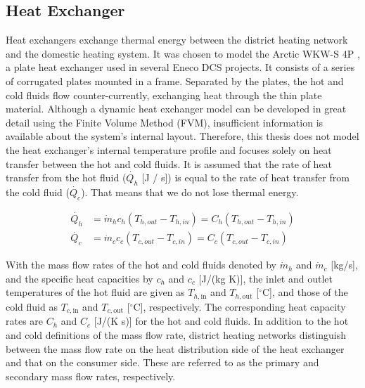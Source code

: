 

\subsection{Heat Exchanger}
Heat exchangers exchange thermal energy between the district heating network and the domestic heating system. It was chosen to model the Arctic WKW-S 4P \cite{fortes_wkw_s_4p}, a plate heat exchanger used in several Eneco DCS projects. It consists of a series of corrugated plates mounted in a frame. Separated by the plates, the hot and cold fluids flow counter-currently, exchanging heat through the thin plate material. Although a dynamic heat exchanger model can be developed in great detail using the Finite Volume Method (FVM), insufficient information is available about the system's internal layout. Therefore, this thesis does not model the heat exchanger's internal temperature profile and focuses solely on heat transfer between the hot and cold fluids. It is assumed that the rate of heat transfer from the hot fluid ($\dot{Q_{h}}$ [J / s]) is equal to the rate of heat transfer from the cold fluid ($\dot{Q_{c}}$). That means that we do not lose thermal energy. 

\begin{equation}\label{eq::hotandcolheatratetransfer}
\begin{split}
    \dot{Q_h} &= \dot{m}_hc_h(T_{h,out} - T_{h,in}) = C_h (T_{h,out} - T_{h,in}) \\  
    \dot{Q_c} &= \dot{m}_cc_c(T_{c,out} - T_{c,in}) = C_c (T_{c,out} - T_{c,in})
\end{split}
\end{equation}

With the mass flow rates of the hot and cold fluids denoted by \( \dot{m}_h \) and \( \dot{m}_c \) [kg/s], and the specific heat capacities by \( c_h \) and \( c_c \) [J/(kg K)], the inlet and outlet temperatures of the hot fluid are given as \( T_{h,\text{in}} \) and \( T_{h,\text{out}} \) [\( ^\circ \)C], and those of the cold fluid as \( T_{c,\text{in}} \) and \( T_{c,\text{out}} \) [\( ^\circ \)C], respectively. The corresponding heat capacity rates are \( C_h \) and \( C_c \) [J/(K s)] for the hot and cold fluids. 
In addition to the hot and cold definitions of the mass flow rate, district heating networks distinguish between the mass flow rate on the heat distribution side of the heat exchanger and that on the consumer side. These are referred to as the primary and secondary mass flow rates, respectively.

